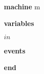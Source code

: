 \begin{block}
  \item   \textbf{machine} m
  \item   \textbf{variables}
  \begin{block}
    \item   $in$
  \end{block}
  \item   \textbf{events}
  \begin{block}
    \item   
  \end{block}
  \item   \textbf{end} \\
\end{block}
